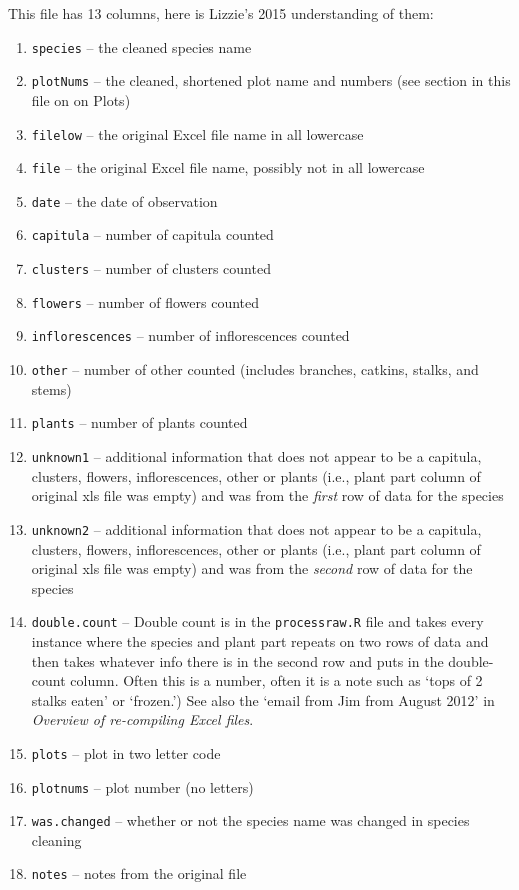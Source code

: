\documentclass[11pt,a4paper]{article}
\begin{document}
This file has 13 columns, here is Lizzie's 2015 understanding of them:
\begin{enumerate}
\item \verb|species| -- the cleaned species name
\item \verb|plotNums| -- the cleaned, shortened plot name and numbers
  (see section in this file on on Plots)
\item \verb|filelow| -- the original Excel file name in all lowercase
\item \verb|file| -- the original Excel file name, possibly not in all lowercase
\item \verb|date| -- the date of observation
\item \verb|capitula| -- number of capitula counted
\item \verb|clusters| -- number of clusters counted
\item \verb|flowers| -- number of flowers counted
\item \verb|inflorescences| -- number of inflorescences counted
\item \verb|other| -- number of other counted (includes branches, catkins, stalks, and stems)
\item \verb|plants| -- number of plants counted      
\item \verb|unknown1| -- additional information that does not appear
  to be a capitula, clusters, flowers, inflorescences, other or plants
  (i.e., plant part column of original xls file was empty)
  and was from the \emph{first} row of data for the species
\item \verb|unknown2| -- additional information that does not appear
  to be a capitula, clusters, flowers, inflorescences, other or plants
  (i.e., plant part column of original xls file was empty)
  and was from the \emph{second} row of data for the species
\item \verb|double.count| -- Double count is in the \verb|processraw.R| file and
takes every instance where the species and plant part repeats on two
rows of data and then
takes
whatever info there is in the second row and puts in the double-count column. Often this
is a number, often it is a note such as `tops of 2 stalks eaten' or
`frozen.')  See also the `email from Jim from August 2012' in \emph{Overview of re-compiling Excel
files}.
\item \verb|plots| -- plot in two letter code
\item \verb|plotnums| -- plot number (no letters) 
\item \verb|was.changed| -- whether or not the species name was
  changed in species cleaning
\item \verb|notes| -- notes from the original file
\end{enumerate}
\end{document}

